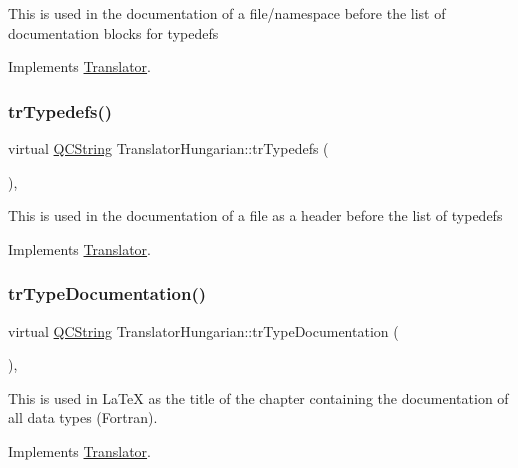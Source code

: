 This is used in the documentation of a file/namespace before the list of documentation blocks for typedefs 

Implements \mbox{\hyperlink{class_translator}{Translator}}.

\mbox{\label{class_translator_hungarian_ab3b1e78c430bd33a4c14363eb286a0f1}} 
\subsubsection{\texorpdfstring{trTypedefs()}{trTypedefs()}}
{\footnotesize\ttfamily virtual \mbox{\hyperlink{class_q_c_string}{Q\+C\+String}} Translator\+Hungarian\+::tr\+Typedefs (\begin{DoxyParamCaption}{ }\end{DoxyParamCaption})\hspace{0.3cm}{\ttfamily [inline]}, {\ttfamily [virtual]}}

This is used in the documentation of a file as a header before the list of typedefs 

Implements \mbox{\hyperlink{class_translator}{Translator}}.

\mbox{\label{class_translator_hungarian_a10c18dc3aaeea411ccb9d851196d92fd}} 
\subsubsection{\texorpdfstring{trTypeDocumentation()}{trTypeDocumentation()}}
{\footnotesize\ttfamily virtual \mbox{\hyperlink{class_q_c_string}{Q\+C\+String}} Translator\+Hungarian\+::tr\+Type\+Documentation (\begin{DoxyParamCaption}{ }\end{DoxyParamCaption})\hspace{0.3cm}{\ttfamily [inline]}, {\ttfamily [virtual]}}

This is used in La\+TeX as the title of the chapter containing the documentation of all data types (Fortran). 

Implements \mbox{\hyperlink{class_translator}{Translator}}.

